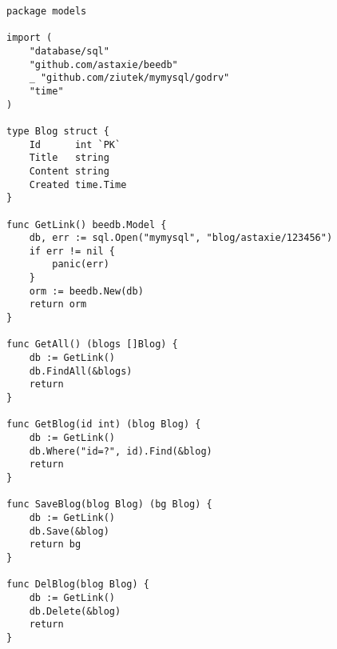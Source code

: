 \begin{lstlisting}[numbers=none]
package models

import (
    "database/sql"
    "github.com/astaxie/beedb"
    _ "github.com/ziutek/mymysql/godrv"
    "time"
)

type Blog struct {
    Id      int `PK`
    Title   string
    Content string
    Created time.Time
}

func GetLink() beedb.Model {
    db, err := sql.Open("mymysql", "blog/astaxie/123456")
    if err != nil {
        panic(err)
    }
    orm := beedb.New(db)
    return orm
}

func GetAll() (blogs []Blog) {
    db := GetLink()
    db.FindAll(&blogs)
    return
}

func GetBlog(id int) (blog Blog) {
    db := GetLink()
    db.Where("id=?", id).Find(&blog)
    return
}

func SaveBlog(blog Blog) (bg Blog) {
    db := GetLink()
    db.Save(&blog)
    return bg
}

func DelBlog(blog Blog) {
    db := GetLink()
    db.Delete(&blog)
    return
}
\end{lstlisting}
